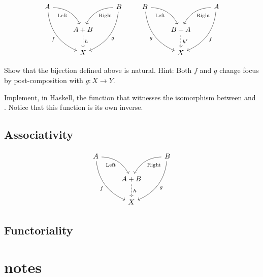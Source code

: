 \documentclass[DaoFP]{subfiles}
\begin{document}
\[
 \begin{tikzcd}
 A
 \arrow[dr,  bend left, "\text{Left}"']
 \arrow[ddr, bend right, "f"']
 && B
 \arrow[dl, bend right, "\text{Right}"]
 \arrow[ddl, bend left, "g"]
 \\
&A + B
\arrow[d, dashed, "h"]
\\
& X
 \end{tikzcd}
 \qquad
 \begin{tikzcd}
 B
 \arrow[dr,  bend left, "\text{Left}"']
 \arrow[ddr, bend right, "g"']
 && A
 \arrow[dl, bend right, "\text{Right}"]
 \arrow[ddl, bend left, "f"]
 \\
&B + A
\arrow[d, dashed, "h'"]
\\
& X
 \end{tikzcd}
\]

\begin{exercise}
Show that the bijection defined above is natural. Hint: Both $f$ and $g$ change focus by post-composition with $g \colon X \to Y$.
\end{exercise}
\begin{exercise}
Implement, in Haskell, the function that witnesses the isomorphism between  and . Notice that this function is its own inverse.
\end{exercise}

\subsection{Associativity}

\[
 \begin{tikzcd}
 A
 \arrow[dr,  bend left, "\text{Left}"']
 \arrow[ddr, bend right, "f"']
 && B
 \arrow[dl, bend right, "\text{Right}"]
 \arrow[ddl, bend left, "g"]
 \\
&A + B
\arrow[d, dashed, "h"]
\\
& X
 \end{tikzcd}
\]

\subsection{Functoriality}

\section{notes}

\begin{exercise}
\end{exercise}
\begin{haskell}
\end{haskell}
\end{document}
